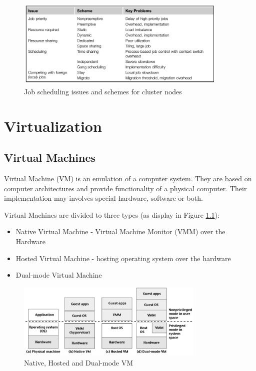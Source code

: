 \documentclass[12pt]{report}
\begin{document}
\begin{figure}[ht]
\centering
     \includegraphics[width=0.9\textwidth]{jobshedule.png}
      \caption{Job scheduling issues and schemes for cluster nodes}
       \label{jobshedule}
\end{figure} 

\chapter{Virtualization}

\section{Virtual Machines}
Virtual Machine (VM) is an emulation of a computer system. They are based on computer architectures and provide functionality of a physical computer. Their implementation may involves special hardware, software or both.

Virtual Machines are divided to three types (as display in Figure \ref{vm}):
\begin{itemize}
\item Native Virtual Machine - Virtual Machine Monitor (VMM) over the Hardware
\item Hosted Virtual Machine - hosting operating system over the hardware
\item Dual-mode Virtual Machine	
\end{itemize}

\begin{figure}[ht]
		\centering
           \includegraphics[width=0.8\textwidth]{vm.png}
         \caption{Native, Hosted and Dual-mode VM}
         \label{vm}
\end{figure} 
\end{document}
